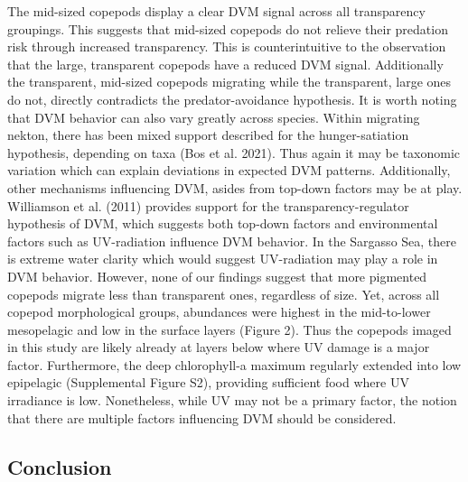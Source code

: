 \documentclass[
]{article}
\begin{document}
The mid-sized copepods display a clear DVM signal across all
transparency groupings. This suggests that mid-sized copepods do not
relieve their predation risk through increased transparency. This is
counterintuitive to the observation that the large, transparent copepods
have a reduced DVM signal. Additionally the transparent, mid-sized
copepods migrating while the transparent, large ones do not, directly
contradicts the predator-avoidance hypothesis. It is worth noting that
DVM behavior can also vary greatly across species. Within migrating
nekton, there has been mixed support described for the hunger-satiation
hypothesis, depending on taxa (Bos et al. 2021). Thus again it may be
taxonomic variation which can explain deviations in expected DVM
patterns. Additionally, other mechanisms influencing DVM, asides from
top-down factors may be at play. Williamson et al. (2011) provides
support for the transparency-regulator hypothesis of DVM, which suggests
both top-down factors and environmental factors such as UV-radiation
influence DVM behavior. In the Sargasso Sea, there is extreme water
clarity which would suggest UV-radiation may play a role in DVM
behavior. However, none of our findings suggest that more pigmented
copepods migrate less than transparent ones, regardless of size. Yet,
across all copepod morphological groups, abundances were highest in the
mid-to-lower mesopelagic and low in the surface layers (Figure 2). Thus
the copepods imaged in this study are likely already at layers below
where UV damage is a major factor. Furthermore, the deep chlorophyll-a
maximum regularly extended into low epipelagic (Supplemental Figure S2),
providing sufficient food where UV irradiance is low. Nonetheless, while
UV may not be a primary factor, the notion that there are multiple
factors influencing DVM should be considered.

\hypertarget{conclusion}{%
\subsection{Conclusion}\label{conclusion}}
\end{document}
